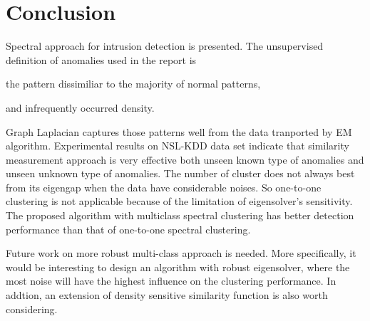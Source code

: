 \section{Conclusion}
Spectral approach for intrusion detection is presented. 
The unsupervised definition of anomalies used in the report is 
\begin{inparaenum}
\item the pattern dissimiliar to the majority of normal patterns, 
\item and infrequently occurred density.
\end{inparaenum}
Graph Laplacian captures those patterns well from the data tranported by EM algorithm. 
Experimental results on NSL-KDD data set indicate that similarity measurement approach is very effective both unseen known type of anomalies and unseen unknown type of anomalies. 
The number of cluster does not always best from its eigengap when the data have considerable noises. 
So one-to-one clustering is not applicable because of the limitation of eigensolver's sensitivity. 
The proposed algorithm with multiclass spectral clustering has better detection performance than that of one-to-one spectral clustering. 

Future work on more robust multi-class approach is needed. 
More specifically, it would be interesting to design an algorithm with robust eigensolver, where the most noise will have the highest influence on the clustering performance. 
In addtion, an extension of density sensitive similarity function is also worth considering. 

